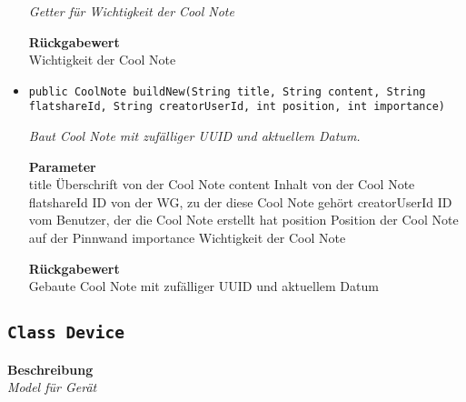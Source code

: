 \begin{itemize}
    	\textit{Getter für Wichtigkeit der Cool Note}
    	
    	
    	
    	\textbf{Rückgabewert} \\
    	Wichtigkeit der Cool Note        \item{\texttt{public CoolNote buildNew(String title, String content, String flatshareId, String creatorUserId, int position, int importance)}}
    	
    	\textit{Baut Cool Note mit zufälliger UUID und aktuellem Datum.}
    	
    	\textbf{Parameter} \\
    	title Überschrift von der Cool Note
    	content Inhalt von der Cool Note
    	flatshareId ID von der WG, zu der diese Cool Note gehört
    	creatorUserId ID vom Benutzer, der die Cool Note erstellt hat
    	position Position der Cool Note auf der Pinnwand
    	importance Wichtigkeit der Cool Note
    	
    	\textbf{Rückgabewert} \\
    	Gebaute Cool Note mit zufälliger UUID und aktuellem Datum
    \end{itemize}
    \subsection{\texttt{Class Device}}
    \textbf{Beschreibung} \\
    \textit{Model für Gerät}
